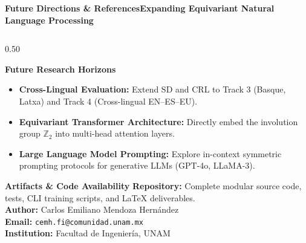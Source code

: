 \documentclass[aspectratio=169,10pt]{beamer}
\begin{document}
\begin{frame}{\textbf{Future Directions \& References}}{\textbf{Expanding Equivariant Natural Language Processing}}
  \begin{columns}[T]
    \begin{column}{0.50\textwidth}
      \begin{block}{\textbf{Future Research Horizons}}
        \scriptsize
        \begin{itemize}\setlength{\itemsep}{1pt}\setlength{\parskip}{0pt}
          \item \textbf{Cross-Lingual Evaluation:} Extend SD and CRL to Track 3 (Basque, Latxa) and Track 4 (Cross-lingual EN--ES--EU).
          \item \textbf{Equivariant Transformer Architecture:} Directly embed the involution group $\mathbb{Z}_2$ into multi-head attention layers.
          \item \textbf{Large Language Model Prompting:} Explore in-context symmetric prompting protocols for generative LLMs (GPT-4o, LLaMA-3).
        \end{itemize}
      \end{block}
      \vspace{0.05cm}
      \begin{block}{\textbf{Artifacts \& Code Availability}}
        \scriptsize
        \textbf{Repository:} Complete modular source code, tests, CLI training scripts, and LaTeX deliverables. \\
        \textbf{Author:} Carlos Emiliano Mendoza Hernández \\
        \textbf{Email:} \texttt{cemh.fi@comunidad.unam.mx} \\
        \textbf{Institution:} Facultad de Ingeniería, UNAM
      \end{block}
    \end{column}


\end{columns}
\end{frame}
\end{document}
